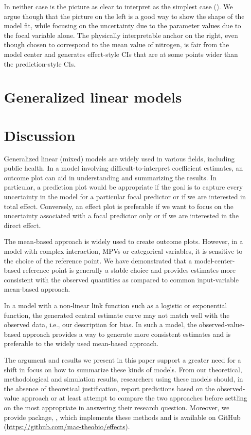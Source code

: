 In neither case is the picture as clear to interpret as the simplest case (). We argue though that the picture on the left is a good way to show the shape of the model fit, while focusing on the uncertainty due to the parameter values due to the focal variable alone. The physically interpretable anchor on the right, even though chosen to correspond to the mean value of nitrogen, is fair from the model center and generates effect-style CIs that are at some points wider than the prediction-style CIs.

\section{Generalized linear models}

\section{Discussion}

Generalized linear (mixed) models are widely used in various fields, including public health. In a model involving difficult-to-interpret coefficient estimates, an outcome plot can aid in understanding and summarizing the results. In particular, a prediction plot would be appropriate if the goal is to capture every uncertainty in the model for a particular focal predictor or if we are interested in total effect. Conversely, an effect plot is preferable if we want to focus on the uncertainty associated with a focal predictor only or if we are interested in the direct effect.

The mean-based approach is widely used to create outcome plots. However, in a model with complex interaction, MPVs or categorical variables, it is sensitive to the choice of the reference point. We have demonstrated that a model-center-based reference point is generally a stable choice and provides estimates more consistent with the observed quantities as compared to common input-variable mean-based approach.

In a model with a non-linear link function such as a logistic or exponential function, the generated central estimate curve may not match well with the observed data, i.e., our description for bias. In such a model, the observed-value-based approach provides a way to generate more consistent estimates and is preferable to the widely used mean-based approach.

The argument and results we present in this paper support a greater need for a shift in focus on how to summarize these kinds of models. From our theoretical, methodological and simulation results, researchers using these models should, in the absence of theoretical justification, report predictions based on the observed-value approach or at least attempt to compare the two approaches before settling on the most appropriate in answering their research question. Moreover, we provide  package, , which implements these methods and is available on GitHub (\href{https://github.com/mac-theobio/effects}{https://github.com/mac-theobio/effects}).

